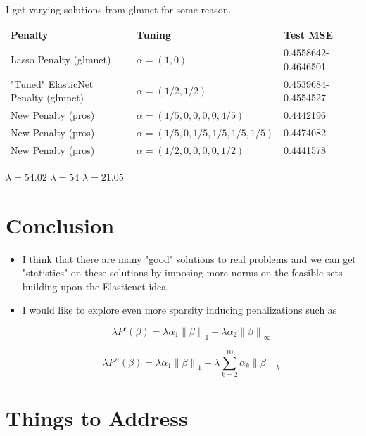 \documentclass[10pt, reqno]{article}
\numberwithin{equation}{section}
\newcommand{\norm}[1]{\left\lVert#1\right\rVert}
\begin{document}
I get varying solutions from glmnet for some reason.

\begin{center}
\begingroup
\setlength{\tabcolsep}{1pt} %
\renewcommand{\arraystretch}{2} %
\begin{tabular}{ l l l}
\textbf{Penalty} & \textbf{Tuning} & \textbf{Test MSE} \\
Lasso Penalty (glmnet) & $\alpha = (1, 0)$ & 0.4558642-0.4646501 \\
"Tuned" ElasticNet Penalty (glmnet) & $\alpha = (1/2, 1/2)$  & 0.4539684-0.4554527   \\
New Penalty (pros) & $\alpha = (1/5, 0, 0, 0, 0, 4/5)$ & 0.4442196 \\
New Penalty (pros) & $\alpha = (1/5, 0, 1/5, 1/5, 1/5, 1/5)$ & 0.4474082 \\
New Penalty (pros) & $\alpha = (1/2, 0, 0, 0, 0, 1/2)$ & 0.4441578 \\
\end{tabular}
\endgroup
\end{center}

$\lambda = 54.02$
$\lambda = 54$
$\lambda = 21.05$

\newpage
\section*{Conclusion}

\begin{itemize}
\item I think that there are many "good" solutions to real problems and we can get "statistics" on these solutions by imposing more norms on the feasible sets building upon the Elasticnet \cite{elasticnet} idea.

\item I would like to explore even more sparsity inducing penalizations such as

\[
\lambda P'(\beta) = \lambda \alpha_1 \norm{\beta}_1 + \lambda \alpha_2 \norm{\beta}_\infty 
\]

\[
\lambda P''(\beta) = \lambda \alpha_1 \norm{\beta}_1 + \lambda \sum_{k = 2}^{10} \alpha_k \norm{\beta}_{k}
\]

\end{itemize}

\newpage
\section*{Things to Address}
\end{document}
